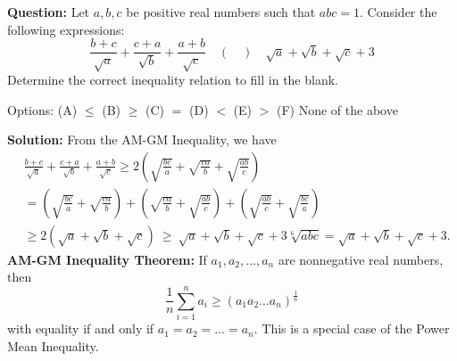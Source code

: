 \begin{examplebox}
    \footnotesize
    \textbf{Question:} Let $a, b, c$ be positive real numbers such that $a b c = 1$. Consider the following expressions:$$\frac{b+c}{\sqrt{a}}+\frac{c+a}{\sqrt{b}}+\frac{a+b}{\sqrt{c}} \quad (\quad) \quad \sqrt{a}+\sqrt{b}+\sqrt{c}+3$$Determine the correct inequality relation to fill in the blank.
    
    \vspace{1mm}
    Options: (A) $\leq$ \quad (B) $\geq$ \quad (C) $=$ \quad (D) $<$ \quad (E) $>$ \quad (F) None of the above
    
    \vspace{1mm}
    \textbf{Solution:} From the AM-GM Inequality, we have
    $$\begin{aligned} 
    & \frac{b+c}{\sqrt{a}}+\frac{c+a}{\sqrt{b}}+\frac{a+b}{\sqrt{c}} \geq 2\left(\sqrt{\frac{b c}{a}}+\sqrt{\frac{c a}{b}}+\sqrt{\frac{a b}{c}}\right) \\ 
    & =\left(\sqrt{\frac{b c}{a}}+\sqrt{\frac{c a}{b}}\right)+\left(\sqrt{\frac{c a}{b}}+\sqrt{\frac{a b}{c}}\right)+\left(\sqrt{\frac{a b}{c}}+\sqrt{\frac{b c}{a}}\right)  \\& 
    \geq 2(\sqrt{a}+\sqrt{b}+\sqrt{c}) ~ \boxed{\geq}  ~ \sqrt{a}+\sqrt{b}+\sqrt{c}+3 \sqrt[6]{a b c}=\sqrt{a}+\sqrt{b}+\sqrt{c}+3.
    \end{aligned}$$
    \textbf{AM-GM Inequality Theorem}\textbf{:} If $a_{1}, a_{2}, \ldots, a_{n}$ are nonnegative real numbers, then$$\frac{1}{n} \sum_{i=1}^{n} a_{i} \geq\left(a_{1} a_{2} \ldots a_{n}\right)^{\frac{1}{n}}$$with equality if and only if $a_{1}=a_{2}=\ldots=a_{n}$. This is a special case of the Power Mean Inequality.
\end{examplebox}
